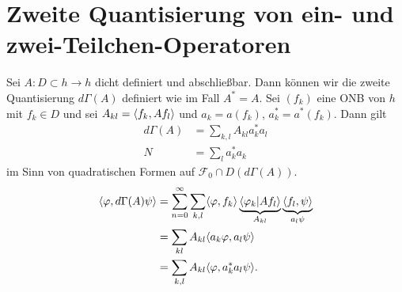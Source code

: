 \documentclass{mycourse}
\begin{document}
\section{Zweite Quantisierung von ein- und zwei-Teilchen-Operatoren}
Sei $A:D\subset h\to h$ dicht definiert und abschließbar. Dann können wir die zweite Quantisierung $d\Gamma(A)$ definiert wie im Fall $A^*=A$. Sei $(f_k)$ eine ONB von $h$ mit $f_k \in D$ und sei $A_{kl} = \langle f_k, A f_l\rangle$ und $a_k = a(f_k)$, $a_k^* = a^*(f_k)$. Dann gilt
\begin{align*}
d\Gamma(A) &= \sum_{k,l} A_{kl} a^*_k a_l\\
N&= \sum_l a_k^* a_k
\end{align*}
im Sinn von quadratischen Formen auf $\mathcal F_0 \cap D(d\Gamma(A))$.
\begin{align*}
\langle \varphi, d\Gamma(A) \psi\rangle &= \sum_{n=0}^\infty \sum_{k,l} \langle \varphi, f_k\rangle \underbrace{\langle \varphi_k |A f_l\rangle}_{A_{kl}} \underbrace{\langle f_l, \psi\rangle}_{a_l\psi}\\
&= \sum_{kl} A_{kl} \langle a_k \varphi, a_l \psi\rangle\\
&= \sum_{k,l} A_{kl} \langle \varphi, a_k^* a_l \psi \rangle.
\end{align*}
\end{document}

